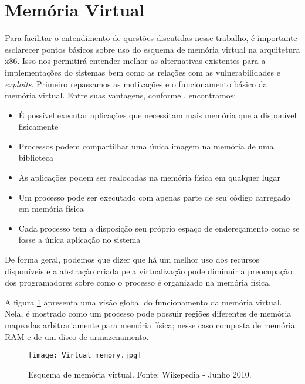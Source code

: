 	\section{Memória Virtual}
		Para facilitar o entendimento de questões discutidas nesse trabalho, é importante esclarecer
		pontos básicos sobre uso do esquema de memória virtual na arquitetura x86.
		Isso nos permitirá entender melhor as alternativas existentes para a implementações
		do sistemas bem como as relações com as vulnerabilidades e \textsl{exploits}.
		Primeiro repassamos as motivações e o funcionamento básico da memória virtual.
		Entre suas vantagens, conforme \cite{Bovet2005}, encontramos:
		\begin{itemize}
			\item{É possível executar aplicações que necessitam mais memória que a disponível fisicamente}
			\item{Processos podem compartilhar uma única imagem na memória de uma biblioteca}
			\item{As aplicações podem ser realocadas na memória física em qualquer lugar}
			\item{Um processo pode ser executado com apenas parte de seu código carregado em memória física}
			\item{Cada processo tem a disposição seu próprio espaço de endereçamento como se fosse
			a única aplicação no sistema} 
		\end{itemize}
		De forma geral, podemos que dizer que há um melhor uso dos recursos disponíveis e a abstração
		criada pela virtualização pode diminuir a preocupação dos programadores sobre
		como o processo é organizado na memória física.

		
		A figura \ref{fig:memoria_virtual} apresenta uma visão global do funcionamento da memória virtual.
		Nela, é mostrado como um processo pode possuir regiões diferentes de memória mapeadas
		arbitrariamente para memória física; nesse caso composta de memória RAM e de um disco de armazenamento.
		\begin{figure}
			\begin{center}
				\texttt{[image: Virtual\_memory.jpg]}
				\caption{Esquema de memória virtual. Fonte: Wikepedia - Junho 2010.}
				\label{fig:memoria_virtual}
			\end{center}
		\end{figure}
		

